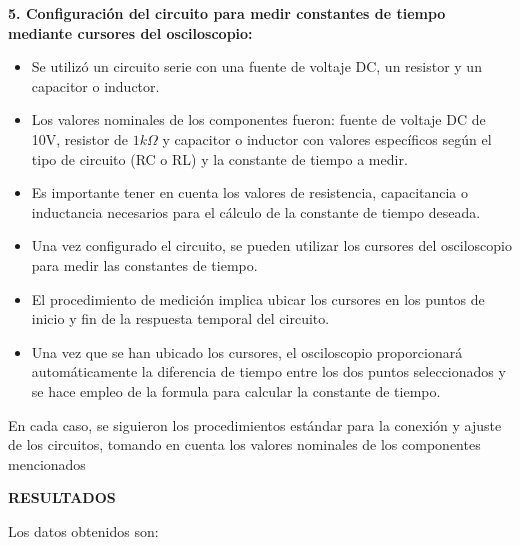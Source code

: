 \documentclass[12pt]{article}
\begin{document}
	\textbf{5. Configuración del circuito para medir constantes de tiempo mediante cursores del osciloscopio:}
	
	\begin{itemize}
		\item Se utilizó un circuito serie con una fuente de voltaje DC, un resistor y un capacitor o inductor.
		\item Los valores nominales de los componentes fueron: fuente de voltaje DC de 10V, resistor de $1k\Omega$ y capacitor o inductor con valores específicos según el tipo de circuito (RC o RL) y la constante de tiempo a medir.
		\item Es importante tener en cuenta los valores de resistencia, capacitancia o inductancia necesarios para el cálculo de la constante de tiempo deseada.
		\item Una vez configurado el circuito, se pueden utilizar los cursores del osciloscopio para medir las constantes de tiempo.
		\item El procedimiento de medición implica ubicar los cursores en los puntos de inicio y fin de la respuesta temporal del circuito.	
		\item Una vez que se han ubicado los cursores, el osciloscopio proporcionará automáticamente la diferencia de tiempo entre los dos puntos seleccionados y se hace empleo de la formula para calcular la constante de tiempo.	
		 		
	\end{itemize}
	
	En cada caso, se siguieron los procedimientos estándar para la conexión y ajuste de los circuitos, tomando en cuenta los valores nominales de los componentes mencionados
	
	\newpage
	
	\begin{center}
		\textbf{\large RESULTADOS}\\
	\end{center}
	
	\noindent Los datos obtenidos son:
	
\end{document}
